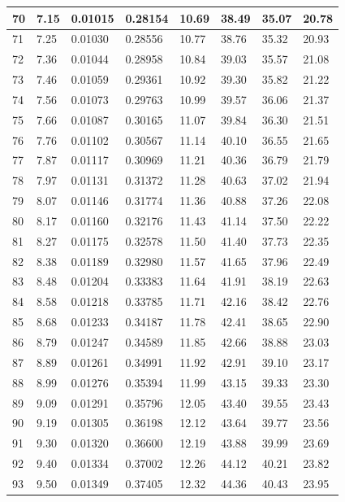\documentclass[12pt,a4paper,twoside]{article}
\begin{document}
\begin{center}
\begin{longtable}{l l l l | l l l l}
70 & 7.15 & 0.01015 & 0.28154 & 10.69 & 38.49 & 35.07 & 20.78 \\ \hline
71 & 7.25 & 0.01030 & 0.28556 & 10.77 & 38.76 & 35.32 & 20.93 \\ \hline
72 & 7.36 & 0.01044 & 0.28958 & 10.84 & 39.03 & 35.57 & 21.08 \\ \hline
73 & 7.46 & 0.01059 & 0.29361 & 10.92 & 39.30 & 35.82 & 21.22 \\ \hline
74 & 7.56 & 0.01073 & 0.29763 & 10.99 & 39.57 & 36.06 & 21.37 \\ \hline
75 & 7.66 & 0.01087 & 0.30165 & 11.07 & 39.84 & 36.30 & 21.51 \\ \hline
76 & 7.76 & 0.01102 & 0.30567 & 11.14 & 40.10 & 36.55 & 21.65 \\ \hline
77 & 7.87 & 0.01117 & 0.30969 & 11.21 & 40.36 & 36.79 & 21.79 \\ \hline
78 & 7.97 & 0.01131 & 0.31372 & 11.28 & 40.63 & 37.02 & 21.94 \\ \hline
79 & 8.07 & 0.01146 & 0.31774 & 11.36 & 40.88 & 37.26 & 22.08 \\ \hline
80 & 8.17 & 0.01160 & 0.32176 & 11.43 & 41.14 & 37.50 & 22.22 \\ \hline
81 & 8.27 & 0.01175 & 0.32578 & 11.50 & 41.40 & 37.73 & 22.35 \\ \hline
82 & 8.38 & 0.01189 & 0.32980 & 11.57 & 41.65 & 37.96 & 22.49 \\ \hline
83 & 8.48 & 0.01204 & 0.33383 & 11.64 & 41.91 & 38.19 & 22.63 \\ \hline
84 & 8.58 & 0.01218 & 0.33785 & 11.71 & 42.16 & 38.42 & 22.76 \\ \hline
85 & 8.68 & 0.01233 & 0.34187 & 11.78 & 42.41 & 38.65 & 22.90 \\ \hline
86 & 8.79 & 0.01247 & 0.34589 & 11.85 & 42.66 & 38.88 & 23.03 \\ \hline
87 & 8.89 & 0.01261 & 0.34991 & 11.92 & 42.91 & 39.10 & 23.17 \\ \hline
88 & 8.99 & 0.01276 & 0.35394 & 11.99 & 43.15 & 39.33 & 23.30 \\ \hline
89 & 9.09 & 0.01291 & 0.35796 & 12.05 & 43.40 & 39.55 & 23.43 \\ \hline
90 & 9.19 & 0.01305 & 0.36198 & 12.12 & 43.64 & 39.77 & 23.56 \\ \hline
91 & 9.30 & 0.01320 & 0.36600 & 12.19 & 43.88 & 39.99 & 23.69 \\ \hline
92 & 9.40 & 0.01334 & 0.37002 & 12.26 & 44.12 & 40.21 & 23.82 \\ \hline
93 & 9.50 & 0.01349 & 0.37405 & 12.32 & 44.36 & 40.43 & 23.95 \\ \hline

\end{longtable}
\end{center}
\end{document}
